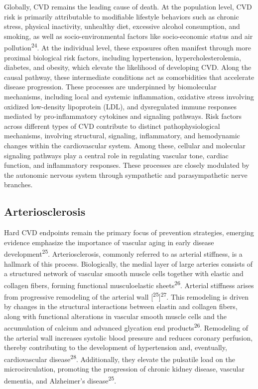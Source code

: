 \documentclass[
  a4paper,
  headsepline=true,
  open=any]{scrbook}
\begin{document}
Globally, CVD remains the leading cause of death. At the population
level, CVD risk is primarily attributable to modifiable lifestyle
behaviors such as chronic stress, physical inactivity, unhealthy diet,
excessive alcohol consumption, and smoking, as well as
socio-environmental factors like socio-economic status and air
pollution\textsuperscript{24}. At the individual level, these exposures
often manifest through more proximal biological risk factors, including
hypertension, hypercholesterolemia, diabetes, and obesity, which elevate
the likelihood of developing CVD. Along the causal pathway, these
intermediate conditions act as comorbidities that accelerate disease
progression. These processes are underpinned by biomolecular mechanisms,
including local and systemic inflammation, oxidative stress involving
oxidized low-density lipoprotein (LDL), and dysregulated immune
responses mediated by pro-inflammatory cytokines and signaling pathways.
Risk factors across different types of CVD contribute to distinct
pathophysiological mechanisms, involving structural, signaling,
inflammatory, and hemodynamic changes within the cardiovascular system.
Among these, cellular and molecular signaling pathways play a central
role in regulating vascular tone, cardiac function, and inflammatory
responses. These processes are closely modulated by the autonomic
nervous system through sympathetic and parasympathetic nerve branches.

\hypertarget{arteriosclerosis}{%
\subsection{Arteriosclerosis}\label{arteriosclerosis}}

Hard CVD endpoints remain the primary focus of prevention strategies,
emerging evidence emphasize the importance of vascular aging in early
disease development\textsuperscript{25}. Arteriosclerosis, commonly
referred to as arterial stiffness, is a hallmark of this process.
Biologically, the medial layer of large arteries consists of a
structured network of vascular smooth muscle cells together with elastic
and collagen fibers, forming functional musculoelastic
sheets\textsuperscript{26}. Arterial stiffness arises from progressive
remodeling of the arterial wall
{[}\textsuperscript{25}{]}\textsuperscript{27}. This remodeling is
driven by changes in the structural interactions between elastin and
collagen fibers, along with functional alterations in vascular smooth
muscle cells and the accumulation of calcium and advanced glycation end
products\textsuperscript{26}. Remodeling of the arterial wall increases
systolic blood pressure and reduces coronary perfusion, thereby
contributing to the development of hypertension and, eventually,
cardiovascular disease\textsuperscript{28}. Additionally, they elevate
the pulsatile load on the microcirculation, promoting the progression of
chronic kidney disease, vascular dementia, and Alzheimer's
disease\textsuperscript{25}.
\end{document}

